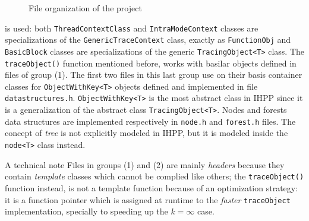 \documentclass[a4paper,11pt]{report}
\begin{document}
\begin{figure}[H]


\caption{File organization of the project}
\label{proj_files}

\end{figure}

\noindent
 is used: 
both \verb|ThreadContextClass| and \verb|IntraModeContext| classes are specializations of
the \verb|GenericTraceContext| class, exactly as \verb|FunctionObj| and 
\verb|BasicBlock| classes are specializations of the generic \verb|TracingObject<T>| class.
The \verb|traceObject()| function mentioned before, works with basilar objects 
defined in files of group (1). The first two files in this last group use on their basis
container classes for \verb|ObjectWithKey<T>| objects defined and implemented 
in file \verb|datastructures.h|.
\verb|ObjectWithKey<T>| is the most abstract class in IHPP since it is a generalization of the abstract class \verb|TracingObject<T>|. 
Nodes and forests data structures are implemented respectively in \verb|node.h| and \verb|forest.h| files. The concept of \emph{tree} is not explicitly modeled in IHPP, but it is 
modeled inside the \verb|node<T>| class instead. 
\begin{paragraph}{A technical note}
Files in groups (1) and (2) 
are mainly \emph{headers} because they
contain \emph{template} classes which cannot be complied like others; 
the \verb|traceObject()| function instead, is not a template function because of 
an optimization strategy: it is a function pointer which is assigned at runtime
to the \emph{faster} \verb|traceObject| implementation, specially to speeding up 
the $k=\infty$ case. 
\end{paragraph}
\end{document}
